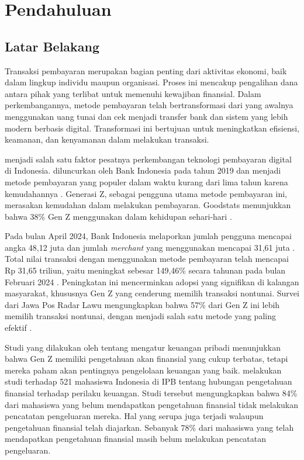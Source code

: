 \chapter{Pendahuluan}
\label{chapter:pendahuluan}

\section{Latar Belakang}
\label{sec:latar-belakang}

Transaksi pembayaran merupakan bagian penting dari aktivitas ekonomi, baik dalam lingkup individu maupun organisasi. Proses ini mencakup pengalihan dana antara pihak yang terlibat untuk memenuhi kewajiban finansial. Dalam perkembangannya, metode pembayaran telah bertransformasi dari yang awalnya menggunakan uang tunai dan cek menjadi transfer bank dan sistem yang lebih modern berbasis digital. Transformasi ini bertujuan untuk meningkatkan efisiensi, keamanan, dan kenyamanan dalam melakukan transaksi.

\qrisfull{} menjadi salah satu faktor pesatnya perkembangan teknologi pembayaran digital di Indonesia. \qris{} diluncurkan oleh Bank Indonesia pada tahun 2019 dan menjadi metode pembayaran yang populer dalam waktu kurang dari lima tahun karena kemudahannya \parencite{qris}. Generasi Z, sebagai pengguna utama metode pembayaran ini, merasakan kemudahan dalam melakukan pembayaran. Goodstats menunjukkan bahwa 38\% Gen Z menggunakan \qris{} dalam kehidupan sehari-hari \parencite{qris2023goodstats}.


Pada bulan April 2024, Bank Indonesia melaporkan jumlah pengguna \qris{} mencapai angka 48,12 juta dan jumlah \emph{merchant} yang menggunakan mencapai 31,61 juta \parencite{CNNqris2024}. Total nilai transaksi dengan menggunakan metode pembayaran \qris{} telah mencapai Rp 31,65 triliun, yaitu meningkat sebesar 149,46\% secara tahunan pada bulan Februari 2024 \parencite{Tempo2024BIQRIS}. Peningkatan ini mencerminkan adopsi yang signifikan di kalangan masyarakat, khususnya Gen Z yang cenderung memilih transaksi nontunai. Survei dari Jawa Pos Radar Lawu mengungkapkan bahwa 57\% dari Gen Z ini lebih memilih transaksi nontunai, dengan \qris{} menjadi salah satu metode yang paling efektif \parencite{jawapos2024qris}.

Studi yang dilakukan oleh \cite{beck2019managing} tentang mengatur keuangan pribadi menunjukkan bahwa Gen Z memiliki pengetahuan akan finansial yang cukup terbatas, tetapi mereka paham akan pentingnya pengelolaan keuangan yang baik. \cite{johan2021effect} melakukan studi terhadap 521 mahasiswa Indonesia di IPB tentang hubungan pengetahuan finansial terhadap perilaku keuangan. Studi tersebut mengungkapkan bahwa 84\% dari mahasiswa yang belum mendapatkan pengetahuan finansial tidak melakukan pencatatan pengeluaran mereka. Hal yang serupa juga terjadi walaupun pengetahuan finansial telah diajarkan. Sebanyak 78\% dari mahasiswa yang telah mendapatkan pengetahuan finansial masih belum melakukan pencatatan pengeluaran. 

